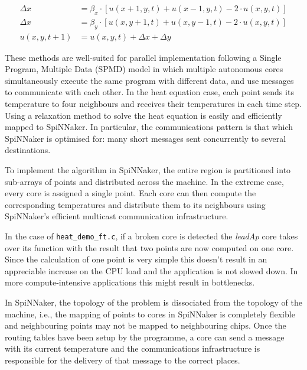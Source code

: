 \documentclass[a4paper, 11pt]{article}
\begin{document}
\begin{align*}
\Delta x   &= \beta_x \cdot [u(x+1,y,t) + u(x-1,y,t) - 2 \cdot u(x,y,t)] \\
\Delta x   &= \beta_y \cdot [u(x,y+1,t) + u(x,y-1,t) - 2 \cdot u(x,y,t)] \\
u(x,y,t+1) &= u(x,y,t) + \Delta x + \Delta y
\end{align*}


These methods are well-suited for parallel implementation following a Single Program, Multiple Data (SPMD) model in which multiple autonomous cores simultaneously execute the same program with different data, and use messages to communicate with each other. In the heat equation case, each point sends its temperature to four neighbours and receives their temperatures in each time step. Using a relaxation method to solve the heat equation is easily and efficiently mapped to SpiNNaker. In particular, the communications pattern is that which SpiNNaker is optimised for: many short messages sent concurrently to several destinations.

To implement the algorithm in SpiNNaker, the entire region is partitioned into sub-arrays of points and distributed across the machine. In the extreme case, every core is assigned a single point. Each core can then compute the corresponding temperatures and distribute them to its neighbours using SpiNNaker's efficient multicast communication infrastructure.

In the case of \verb|heat_demo_ft.c|, if a broken core is detected the \emph{leadAp} core takes over its function with the result that two points are now computed on one core. Since the calculation of one point is very simple this doesn't result in an appreciable increase on the CPU load and the application is not slowed down. In more compute-intensive applications this might result in bottlenecks.

In SpiNNaker, the topology of the problem is dissociated from the topology of the machine, i.e., the mapping of points to cores in SpiNNaker is completely flexible and neighbouring points may not be mapped to neighbouring chips. Once the routing tables have been setup by the programme, a core can send a message with its current temperature and the communications infrastructure is responsible for the delivery of that message to the correct places.
\end{document}
